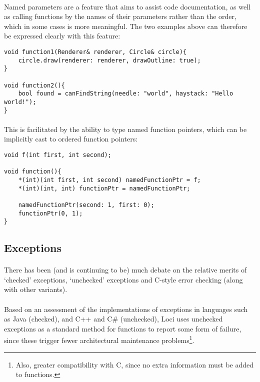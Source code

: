 \documentclass[12pt,twoside,notitlepage]{report}
\begin{document}
\paragraph{}
Named parameters are a feature that aims to assist code documentation, as well as calling functions by the names of their parameters rather than the order, which in some cases is more meaningful. The two examples above can therefore be expressed clearly with this feature:

\begin{lstlisting}
void function1(Renderer& renderer, Circle& circle){
	circle.draw(renderer: renderer, drawOutline: true);
}

void function2(){
	bool found = canFindString(needle: "world", haystack: "Hello world!");
}
\end{lstlisting}

\paragraph{}
This is facilitated by the ability to type named function pointers, which can be implicitly cast to ordered function pointers:

\begin{lstlisting}
void f(int first, int second);

void function(){
	*(int)(int first, int second) namedFunctionPtr = f;
	*(int)(int, int) functionPtr = namedFunctionPtr;
	
	namedFunctionPtr(second: 1, first: 0);
	functionPtr(0, 1);
}
\end{lstlisting}

\clearpage

\subsection{Exceptions}

\paragraph{}
There has been (and is continuing to be) much debate on the relative merits of `checked' exceptions, `unchecked' exceptions and C-style error checking (along with other variants).

\paragraph{}
Based on an assessment of the implementations of exceptions in languages such as Java (checked), and C++ and C\# (unchecked), Loci uses unchecked exceptions as a standard method for functions to report some form of failure, since these trigger fewer architectural maintenance problems\footnote{Also, greater compatibility with C, since no extra information must be added to functions.}.
\end{document}

